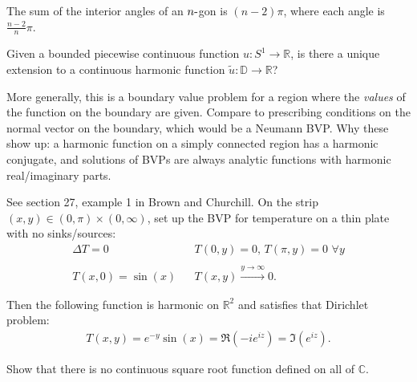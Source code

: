 \begin{fact}

The sum of the interior angles of an \(n{\hbox{-}}\)gon is \((n-2)\pi\),
where each angle is \(\frac{n-2}{n}\pi\).

\end{fact}

\begin{definition}

Given a bounded piecewise continuous function \(u:S^1\to {\mathbb{R}}\),
is there a unique extension to a continuous harmonic function
\(\tilde u: {\mathbb{D}}\to {\mathbb{R}}\)?

\end{definition}

\begin{remark}

More generally, this is a boundary value problem for a region where the
\emph{values} of the function on the boundary are given. Compare to
prescribing conditions on the normal vector on the boundary, which would
be a Neumann BVP. Why these show up: a harmonic function on a simply
connected region has a harmonic conjugate, and solutions of BVPs are
always analytic functions with harmonic real/imaginary parts.

\end{remark}

\begin{example}

See section 27, example 1 in Brown and Churchill. On the strip
\((x, y)\in (0, \pi) \times(0, \infty)\), set up the BVP for temperature
on a thin plate with no sinks/sources:
\begin{align*}
\Delta T = 0 && T(0, y) = 0,\, T(\pi, y) = 0 \,\,\forall y \\ \\
T(x, 0) = \sin(x) && T(x, y) \overset{y\to\infty}\longrightarrow 0
.\end{align*}

Then the following function is harmonic on \({\mathbb{R}}^2\) and
satisfies that Dirichlet problem:
\begin{align*}
T(x ,y) = e^{-y} \sin(x) = \Re(-ie^{iz}) = \Im(e^{iz})
.\end{align*}

\end{example}

\begin{exercise}[?]

Show that there is no continuous square root function defined on all of
\({\mathbb{C}}\).

\end{exercise}

